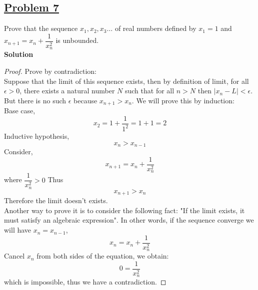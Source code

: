 \documentclass[10pt,letterpaper]{article}
\newcommand{\sol}{\textbf{Solution}}
\begin{document}
	\subsection*{{\color{red}\underline{Problem 7}}}
	Prove that the sequence $x_1, x_2, x_3 \ldots$ of real numbers defined by $x_1 = 1$ and $x_{n+1} = x_n + \dfrac{1}{x_n^2}$
	is unbounded. \\
	\sol 
	\begin{proof}
		Prove by contradiction: \\
		Suppose that the limit of this sequence exists, then by definition of limit, for all $\epsilon > 0$, there exists 
		a natural number $N$ such that for all $n > N$ then $|x_n - L| < \epsilon$. But there is no such $\epsilon$ because
		$x_{n+1} > x_{n}$. We will prove this by induction: \\
		Base case, 
			$$x_{2} = 1 + \dfrac{1}{1^2} = 1 + 1 = 2$$ 
		Inductive hypothesis,
			$$x_{n} > x_{n - 1}$$
		Consider,
			$$x_{n+1} = x_n + \dfrac{1}{x_n^2}$$
		where $\dfrac{1}{x_n^2} > 0$ 
		Thus $$x_{n+1} > x_n$$
		Therefore the limit doesn't exists. \\
		Another way to prove it is to consider the following fact: "If the limit exists, it must satisfy an algebraic expression". 
		In other words, if the sequence converge we will have $x_n = x_{n - 1}$, 
		$$x_n = x_n + \dfrac{1}{x_n^2}$$ 
		Cancel $x_n$ from both sides of the equation, we obtain:
		$$0 = \dfrac{1}{x_n^2}$$
		which is impossible, thus we have a contradiction.
		
	\end{proof}
	
\end{document}
